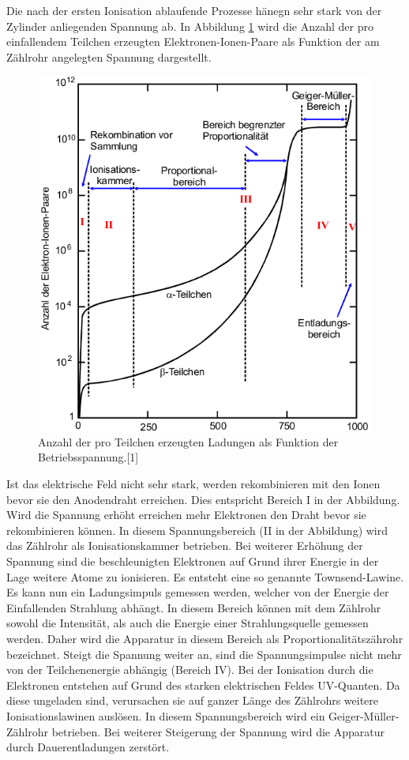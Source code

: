 \documentclass[11pt,ngerman,a4paper]{article}
\begin{document}
Die nach der ersten Ionisation ablaufende Prozesse hänegn sehr stark von der Zylinder anliegenden Spannung ab. In Abbildung \ref{abb2} wird die Anzahl der pro einfallendem Teilchen erzeugten Elektronen-Ionen-Paare als Funktion der am Zählrohr angelegten Spannung dargestellt.
\begin{figure}[htp]
\centering
\includegraphics[scale=0.5]{abb2.png}
\caption{Anzahl der pro Teilchen erzeugten Ladungen als Funktion der Betriebsspannung.[1]}
\label{abb2}
\end{figure}
Ist das elektrische Feld nicht sehr stark, werden rekombinieren mit den Ionen bevor sie den Anodendraht erreichen. Dies entspricht Bereich I in der Abbildung. Wird die Spannung erhöht erreichen mehr Elektronen den Draht bevor sie rekombinieren können. In diesem Spannungsbereich (II in der Abbildung) wird das Zählrohr als Ionisationskammer betrieben. Bei weiterer Erhöhung der Spannung sind  die beschleunigten Elektronen auf Grund ihrer Energie in der Lage weitere Atome zu ionisieren. Es entsteht eine so genannte Townsend-Lawine. Es kann nun ein Ladungsimpuls gemessen werden, welcher von der Energie der Einfallenden Strahlung abhängt. In diesem Bereich können mit dem Zählrohr sowohl die Intensität, als auch die Energie einer Strahlungsquelle gemessen werden. Daher wird die Apparatur in diesem Bereich als Proportionalitätszährohr bezeichnet. 
Steigt die Spannung weiter an, sind die Spannungsimpulse nicht mehr von der Teilchenenergie abhängig (Bereich IV). Bei der Ionisation durch die Elektronen entstehen auf Grund des starken elektrischen Feldes UV-Quanten. Da diese ungeladen sind, verursachen sie auf ganzer Länge des Zählrohrs weitere Ionisationslawinen auslösen. In diesem Spannungsbereich wird ein Geiger-Müller-Zählrohr betrieben.
Bei weiterer Steigerung der Spannung wird die Apparatur durch Dauerentladungen zerstört.
\end{document}
